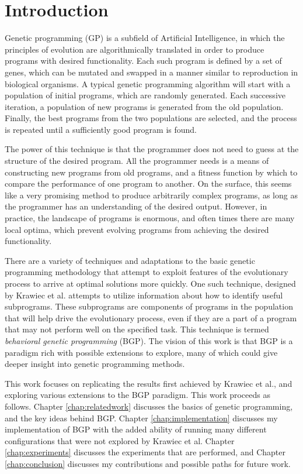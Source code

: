 \chapter{Introduction}
\label{chap:intro}
Genetic programming (GP) \cite{koza} is a subfield of Artificial Intelligence, in which the principles of evolution are algorithmically translated in order to produce programs with desired functionality.  Each such program is defined by a set of genes, which can be mutated and swapped in a manner similar to reproduction in biological organisms.  A typical genetic programming algorithm will start with a population of initial programs, which are randomly generated.  Each successive iteration, a population of new programs is generated from the old population.  Finally, the best programs from the two populations are selected, and the process is repeated until a sufficiently good program is found.

The power of this technique is that the programmer does not need to guess at the structure of the desired program.  All the programmer needs is a means of constructing new programs from old programs, and a fitness function by which to compare the performance of one program to another.  On the surface, this seems like a very promising method to produce arbitrarily complex programs, as long as the programmer has an understanding of the desired output.  However, in practice, the landscape of programs is enormous, and often times there are many local optima, which prevent evolving programs from achieving the desired functionality.

There are a variety of techniques and adaptations to the basic genetic programming methodology that attempt to exploit features of the evolutionary process to arrive at optimal solutions more quickly.  One such technique, designed by Krawiec et al. \cite{krawiec} attempts to utilize information about how to identify useful subprograms.  These subprograms are components of programs in the population that will help drive the evolutionary process, even if they are a part of a program that may not perform well on the specified task.  This technique is termed \textit{behavioral genetic programming} (BGP).  The vision of this work is that BGP is a paradigm rich with possible extensions to explore, many of which could give deeper insight into genetic programming methods.

This work focuses on replicating the results first achieved by Krawiec et al., and exploring various extensions to the BGP paradigm.  This work proceeds as follows. Chapter \ref{chap:relatedwork} discusses the basics of genetic programming, and the key ideas behind BGP.  Chapter \ref{chap:implementation} discusses my implementation of BGP with the added ability of running many different configurations that were not explored by Krawiec et al.  Chapter \ref{chap:experiments} discusses the experiments that are performed, and Chapter \ref{chap:conclusion} discusses my contributions and possible paths for future work.
